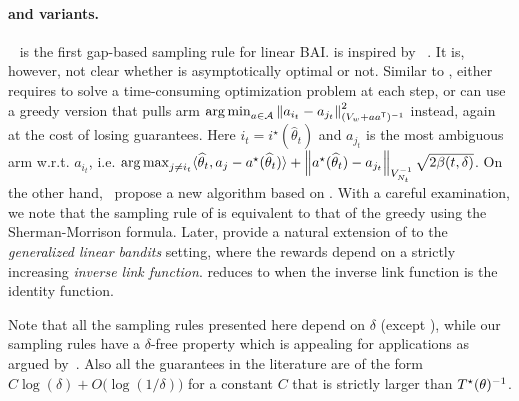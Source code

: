 \paragraph{\LGapE and variants.} \LGapE~\citep{xu2018linear} is the first gap-based sampling rule for linear BAI. \LGapE is inspired by \UGapE~\citep{gabillon2012ugape}. It is, however, not clear whether \LGapE is asymptotically optimal or not. Similar to \XYS, \LGapE either requires to solve a time-consuming optimization problem at each step, or can use a greedy version that pulls arm $\operatorname*{arg\,min}_{a\in\mathcal{A}} \left\lVert a_{i_t}-a_{j_t}\right\rVert_{(V_w+aa^{\mathsf{\scriptscriptstyle T}})^{-1}}^2$ instead, again at the cost of losing guarantees. Here $i_t = i^\star(\hat\theta_t)$ and $a_{j_t}$ is the most ambiguous arm w.r.t. $a_{i_t}$, i.e. $\operatorname*{arg\,max}_{j\neq i_t}\langle\widehat\theta_t,a_{j}-a^\star(\widehat\theta_t)\rangle + \left\lVert a^\star(\widehat\theta_t) - a_{j_t}\right\rVert_{V_{N_t}^{-1}} \sqrt{2\beta(t,\delta)}$. On the other hand,~\citet{zaki2019maxoverlap} propose a new algorithm based on \LUCB. With a careful examination, we note that the sampling rule of \GLUCB is equivalent to that of the greedy \LGapE using the Sherman-Morrison formula. Later, \citet{kazerouni2019glb} provide a natural extension of \LGapE to the \emph{generalized linear bandits} setting, where the rewards depend on a strictly increasing \emph{inverse link function}. \GLGapE reduces to \LGapE when the inverse link function is the identity function.

Note that all the sampling rules presented here depend on $\delta$ (except \XYS), while our sampling rules have a $\delta$-free property which is appealing for applications as argued by~\citet{jun2016atlucb}.  Also all the guarantees in the literature are of the form $C\log(\delta) + O\big(\log(1/\delta)\big)$ for a constant $C$ that is strictly larger than $T^{\star}(\theta)^{-1}$.
